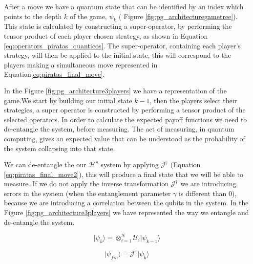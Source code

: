After a move we have a quantum state that can be identified by an index which points to the depth $k$ of the game, $\psi_{k}$ ( Figure \ref{fig:pg_architecturegametree}). This state is calculated by constructing a super-operator, by performing the tensor product of each player chosen strategy, as shown in Equation \ref{eq:operators_piratas_quanticos}. The super-operator, containing each player's strategy, will then be applied to the initial state, this will correspond to the players making a simultaneous move represented in Equation\ref{eq:piratas_final_move}.

In the Figure \ref{fig:pg_architecture3players} we have a representation of the game.We start by building our initial state $k-1$, then the players  select their strategies, a super operator is constructed by performing a tensor product of the selected operators. In order to calculate the expected payoff functions we need to de-entangle the system, before measuring. The act of measuring, in quantum computing, gives an expected value that can be understood as the probability of the system collapsing into that state. 

We can de-entangle the our $\mathcal{H}^{8}$ system by applying $\mathcal{J}^{\dagger}$ (Equation \ref{eq:piratas_final_move2}), this will produce a final state that we will be able to measure. If we do not apply the inverse transformation $\mathcal{J}^{\dagger}$ we are introducing errors in the system (when the entanglement parameter $\gamma$ is different than $0$), because we are introducing a correlation between the qubits in the system. In the Figure \ref{fig:pg_architecture3players} we have represented the way we entangle and de-entangle the system.

\begin{equation}
\vert\psi_{k}\rangle=\otimes_{i=1}^{N} \mathcal{U}_{i}\vert\psi_{k-1}\rangle
\label{eq:piratas_final_move}
\end{equation}

\begin{equation}
\vert\psi_{fin}\rangle= \mathcal{J}^{\dagger}\vert\psi_{k}\rangle
\label{eq:piratas_final_move2}
\end{equation}

